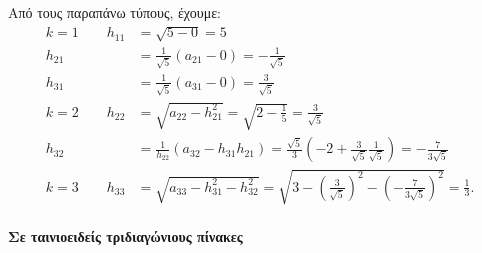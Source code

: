 \documentclass[11pt,a4paper,notitlepage,fleqn,final]{article}
\begin{document}
Από τους παραπάνω τύπους, έχουμε:
\begin{align*}
	\boxed{k=1} \qquad
	h_{11} &= \sqrt{5-0} = 5 \\
	h_{21} &= \frac{1}{\sqrt{5}} \left(a_{21}-0\right)=
	-\frac{1}{\sqrt{5}} \\
	h_{31} &= \frac{1}{\sqrt{5}} (a_{31}-0)=\frac{3}{\sqrt{5}} \\
	\boxed{k=2} \qquad h_{22} &= \sqrt{a_{22}-h_{21}^2}
	= \sqrt{2-\frac{1}{5}} = \frac{3}{\sqrt{5}}
	\\ h_{32} &= \frac{1}{h_{22}}(a_{32}-h_{31}h_{21})
	=\frac{\sqrt{5}}{3}\left(
	-2+\frac{3}{\sqrt{5}}\frac{1}{\sqrt{5}}\right)
	= -\frac{7}{3\sqrt{5}}
	\\ \boxed{k=3} \qquad h_{33} &=
	\sqrt{a_{33}-h_{31}^2-h_{32}^2}=
	\sqrt{3-\left(\frac{3}{\sqrt{5}}\right)^2
	-\left(-\frac{7}{3\sqrt{5}}\right)^2} = \frac{1}{3}.
\end{align*}

\paragraph{Σε ταινιοειδείς τριδιαγώνιους πίνακες}
\hspace{0pt}
\end{document}

